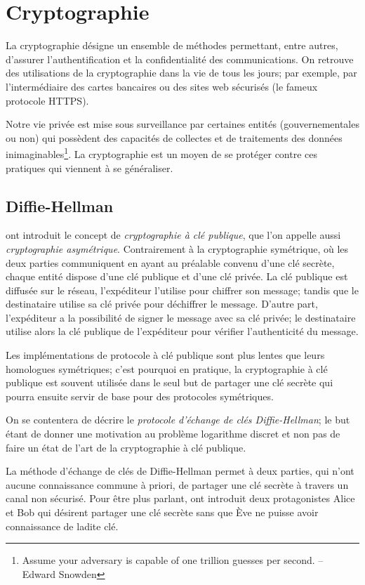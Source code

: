 \documentclass[a4paper,12pt]{article}
\theoremstyle{definition}
\theoremstyle{remark}
\numberwithin{equation}{section}
\begin{document}
\section{Cryptographie}

La cryptographie désigne un ensemble de méthodes permettant, entre autres, d'assurer l'authentification et la confidentialité des communications. On retrouve des utilisations de la cryptographie dans la vie de tous les jours; par exemple, par l'intermédiaire des cartes bancaires ou des sites web sécurisés (le fameux protocole HTTPS).

Notre vie privée est mise sous surveillance par certaines entités (gouvernementales ou non) qui possèdent des capacités de collectes et de traitements des données inimaginables\footnote{Assume your adversary is capable of one trillion guesses per second. -- Edward Snowden}.
La cryptographie est un moyen de se protéger contre ces pratiques qui viennent à se généraliser.

\subsection{Diffie-Hellman}
\cite{diffie-hellman} ont introduit le concept de \emph{cryptographie à clé publique}, que l'on appelle aussi \emph{cryptographie asymétrique}. Contrairement à la cryptographie symétrique, où les deux parties communiquent en ayant au préalable convenu d'une clé secrète, chaque entité dispose d'une clé publique et d'une clé privée. La clé publique est diffusée sur le réseau, l'expéditeur l'utilise pour chiffrer son message; tandis que le destinataire utilise sa clé privée pour déchiffrer le message. D'autre part, l'expéditeur a la possibilité de signer le message avec sa clé privée; le destinataire utilise alors la clé publique de l'expéditeur pour vérifier l'authenticité du message.

Les implémentations de protocole à clé publique sont plus lentes que leurs homologues symétriques; c'est pourquoi en pratique, la cryptographie à clé publique est souvent utilisée dans le seul but de partager une clé secrète qui pourra ensuite servir de base pour des protocoles symétriques.

On se contentera de décrire le \emph{protocole d'échange de clés Diffie-Hellman}; le but étant de donner une motivation au problème logarithme discret et non pas de faire un état de l'art de la cryptographie à clé publique.

La méthode d'échange de clés de Diffie-Hellman permet à deux parties, qui n'ont aucune connaissance commune à priori, de partager une clé secrète à travers un canal non sécurisé. Pour être plus parlant, ont introduit deux protagonistes Alice et Bob qui désirent partager une clé secrète sans que Ève ne puisse avoir connaissance de ladite clé.
\end{document}
